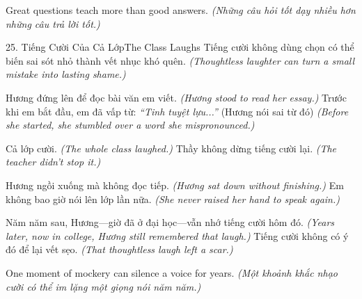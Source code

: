 \begin{baihoc}
Great questions teach more than good answers.
\textit{(Những câu hỏi tốt dạy nhiều hơn những câu trả lời tốt.)}
\end{baihoc}

\begin{truyen}{25. Tiếng Cười Của Cả Lớp}{The Class Laughs}
Tiếng cười không dùng chọn có thể biến sai sót nhỏ thành vết nhục khó quên.
\textit{(Thoughtless laughter can turn a small mistake into lasting shame.)}

Hương đứng lên để đọc bài văn em viết.
\textit{(Hương stood to read her essay.)}
Trước khi em bắt đầu, em đã vấp từ: \textit{``Tinh tuyệt lựu...''} (Hương nói sai từ đó)
\textit{(Before she started, she stumbled over a word she mispronounced.)}

Cả lớp cười.
\textit{(The whole class laughed.)}
Thầy không dừng tiếng cười lại.
\textit{(The teacher didn't stop it.)}

Hương ngồi xuống mà không đọc tiếp.
\textit{(Hương sat down without finishing.)}
Em không bao giờ nói lên lớp lần nữa.
\textit{(She never raised her hand to speak again.)}

Năm năm sau, Hương—giờ đã ở đại học—vẫn nhớ tiếng cười hôm đó.
\textit{(Years later, now in college, Hương still remembered that laugh.)}
Tiếng cười không có ý đó để lại vết sẹo.
\textit{(That thoughtless laugh left a scar.)}
\end{truyen}

\begin{ghinhoanh}
One moment of mockery can silence a voice for years.
\textit{(Một khoảnh khắc nhạo cười có thể im lặng một giọng nói năm năm.)}
\end{ghinhoanh}

